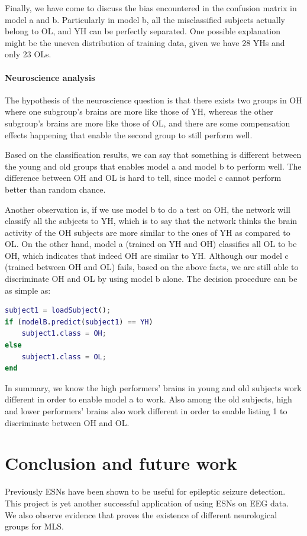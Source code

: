 \documentclass[a4paper,11pt,oneside]{article}
\begin{document}
Finally, we have come to discuss the bias encountered in the confusion matrix in model a and b. Particularly in model b, all the misclassified subjects actually belong to OL, and YH can be perfectly separated. One possible explanation might be the uneven distribution of training data, given we have 28 YHs and only 23 OLs. 


\paragraph{Neuroscience analysis}
The hypothesis of the neuroscience question is that there exists two groups in OH where one subgroup's brains are more like those of YH, whereas the other subgroup's brains are more like those of OL, and there are some compensation effects happening that enable the second group to still perform well. 

Based on the classification results, we can say that something is different between the young and old groups that enables model a and model b to perform well. The difference between OH and OL is hard to tell, since model c cannot perform better than random chance. 

Another observation is, if we use model b to do a test on OH, the network will classify all the subjects to YH, which is to say that the network thinks the brain activity of the OH subjects are more similar to the ones of YH as compared to OL. On the other hand, model a (trained on YH and OH) classifies all OL to be OH, which indicates that indeed OH are similar to YH. Although our model c (trained between OH and OL) fails, based on the above facts, we are still able to discriminate OH and OL by using model b alone. The decision procedure can be as simple as: 

\begin{lstlisting}[language = Matlab, caption = Classification function between OH and OL]
subject1 = loadSubject();
if (modelB.predict(subject1) == YH)
	subject1.class = OH;
else 
	subject1.class = OL;
end
\end{lstlisting}

In summary, we know the high performers' brains in young and old subjects work different in order to enable model a to work. Also among the old subjects, high and lower performers' brains also work different in order to enable listing 1 to discriminate between OH and OL.

\section{Conclusion and future work}
Previously ESNs have been shown to be useful for epileptic seizure detection. This project is yet another successful application of using ESNs on EEG data. We also observe evidence that proves the existence of different neurological groups for MLS.
\end{document}

